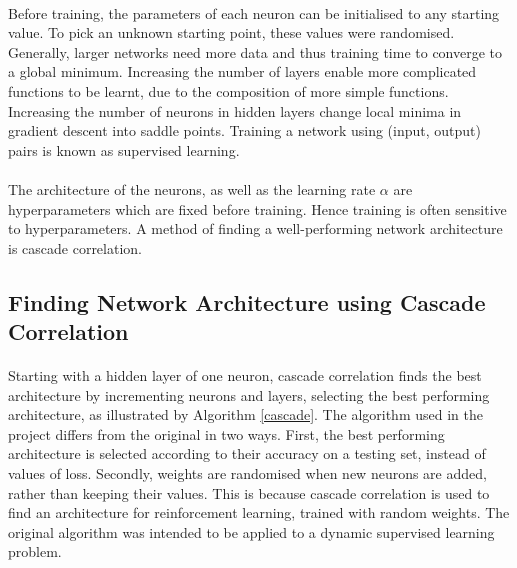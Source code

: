 \documentclass[12pt,a4paper]{book}
\begin{document}
\paragraph{} Before training, the parameters of each neuron can be initialised to any starting value. To pick an unknown starting point, these values were randomised. Generally, larger networks need more data and thus training time to converge to a global minimum. Increasing the number of layers enable more complicated functions to be learnt, due to the composition of more simple functions. Increasing the number of neurons in hidden layers change local minima in gradient descent into saddle points. Training a network using (input, output) pairs is known as supervised learning.

\paragraph{} The architecture of the neurons, as well as the learning rate $\alpha$ are hyperparameters which are fixed before training. Hence training is often sensitive to hyperparameters. A method of finding a well-performing network architecture is cascade correlation.

\subsection{Finding Network Architecture using Cascade Correlation}

\paragraph{} Starting with a hidden layer of one neuron, cascade correlation finds the best architecture by incrementing neurons and layers, selecting the best performing architecture, as illustrated by Algorithm \ref{cascade}. The algorithm used in the project differs from the original in two ways. First, the best performing architecture is selected according to their accuracy on a testing set, instead of values of loss. Secondly, weights are randomised when new neurons are added, rather than keeping their values. This is because cascade correlation is used to find an architecture for reinforcement learning, trained with random weights. The original algorithm was intended to be applied to a dynamic supervised learning problem. \label{cascade}
\end{document}
